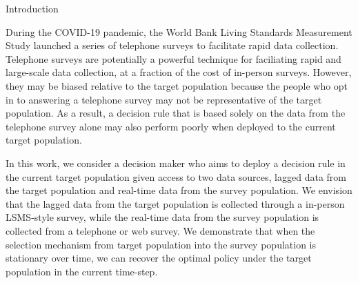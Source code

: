 \documentclass{article}
\theoremstyle{definition}
\theoremstyle{plain}
\theoremstyle{remark}
\begin{document}
\begin{section}{Introduction}


During the COVID-19 pandemic, the World Bank Living Standards Measurement Study launched a series of telephone surveys to facilitate rapid data collection. Telephone surveys are potentially a powerful technique for faciliating rapid and large-scale data collection, at a fraction of the cost of in-person surveys. However, they may be biased relative to the target population because the people who opt in to answering a telephone survey may not be representative of the target population. As a result, a decision rule that is based solely on the data from the telephone survey alone may also perform poorly when deployed to the current target population.

In this work, we consider a decision maker who aims to deploy a decision rule in the current target population given access to two data sources, lagged data from the target population and real-time data from the survey population. We envision that the lagged data from the target population is collected through a in-person LSMS-style survey, while the real-time data from the survey population is collected from a telephone or web survey. We demonstrate that when the selection mechanism from target population into the survey population is stationary over time, we can recover the optimal policy under the target population in the current time-step.


\end{section}
\end{document}

